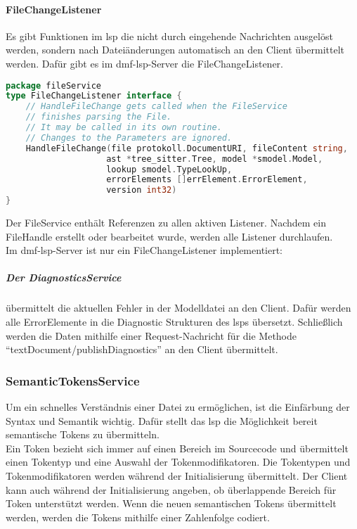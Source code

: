 \documentclass[./einleitung.tex]{subfiles}
\begin{document}
    \paragraph{FileChangeListener}
    Es gibt Funktionen im \acrshort{lsp} die nicht durch eingehende Nachrichten ausgelöst werden, sondern nach Dateiänderungen automatisch an den Client übermittelt werden.
    Dafür gibt es im \acrshort{dmf}-\acrshort{lsp}-Server die FileChangeListener.
    \begin{lstlisting}[language=Go]
package fileService
type FileChangeListener interface {
	// HandleFileChange gets called when the FileService
    // finishes parsing the File.
    // It may be called in its own routine.
    // Changes to the Parameters are ignored.
	HandleFileChange(file protokoll.DocumentURI, fileContent string,
                    ast *tree_sitter.Tree, model *smodel.Model,
                    lookup smodel.TypeLookUp,
                    errorElements []errElement.ErrorElement,
                    version int32)
}
    \end{lstlisting}
    Der FileService enthält Referenzen zu allen aktiven Listener.
    Nachdem ein FileHandle erstellt oder bearbeitet wurde, werden alle Listener durchlaufen.\\
    Im \acrshort{dmf}-\acrshort{lsp}-Server ist nur ein FileChangeListener implementiert:
    \subparagraph{Der DiagnosticsService}
    übermittelt die aktuellen Fehler in der Modelldatei an den Client.
    Dafür werden alle ErrorElemente in die Diagnostic Strukturen des \acrshort{lsp}s übersetzt.
    Schließlich werden die Daten mithilfe einer Request-Nachricht für die Methode ``textDocument/publishDiagnostics'' an den Client übermittelt.

    \subsubsection{SemanticTokensService}\label{subsubsec:semantic-service}
    Um ein schnelles Verständnis einer Datei zu ermöglichen, ist die Einfärbung der Syntax und Semantik wichtig.
    Dafür stellt das \acrshort{lsp} die Möglichkeit bereit semantische Tokens zu übermitteln.\\
    Ein Token bezieht sich immer auf einen Bereich im Sourcecode und übermittelt einen Tokentyp und eine Auswahl der Tokenmodifikatoren.
    Die Tokentypen und Tokenmodifikatoren werden während der Initialisierung übermittelt.
    Der Client kann auch während der Initialisierung angeben, ob überlappende Bereich für Token unterstützt werden.
    Wenn die neuen semantischen Tokens übermittelt werden, werden die Tokens mithilfe einer Zahlenfolge codiert.
\end{document}
